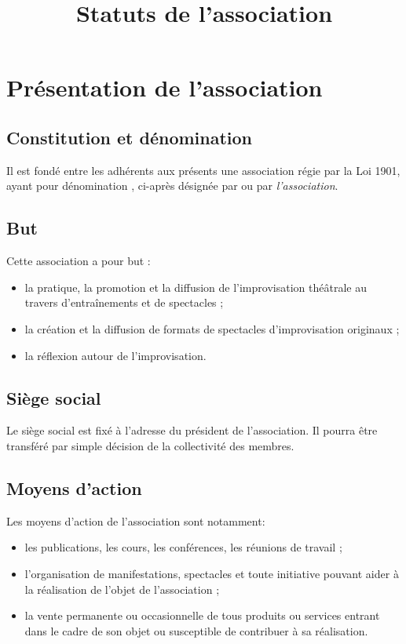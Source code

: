 \documentclass[a4paper,french,10pt]{article}
\title{Statuts de l'association \metae{}}
\newcommand{\article}[1]{\subsection{#1}\addtocounter{article}{1}}
\newcounter{article}
\begin{document}
\date{}

\maketitle 
\pagestyle{fancy} 


\rhead{\thepage} 
\cfoot{} 


\setcounter{article}{1}
\section{Présentation de l’association}
\article{Constitution et dénomination}
\label{sec:constitution}
Il est fondé entre les adhérents aux présents \statuts{} une association
régie par la Loi 1901, ayant pour dénomination \textit{\metae{}}, ci-après désignée par \textit{\meta{}} ou par \textit{l'association}.

\article{But}
\label{sec:but}

Cette association a pour but :
\begin{itemize}
\item la pratique, la promotion et la diffusion de l'improvisation théâtrale au travers d'entraînements et de spectacles ;
\item la création et la diffusion de formats de spectacles d'improvisation originaux ;
\item la réflexion autour de l'improvisation.
\end{itemize}

\article{Siège social}
\label{sec:siege}

Le siège social est fixé à l'adresse du président de l'association. Il
pourra être transféré par simple décision de la collectivité des
membres.

\article{Moyens d’action}
\label{sec:moyens}

Les moyens d’action de l’association sont notamment:
\begin{itemize}
\item les publications, les cours, les conférences, les réunions de
travail ;
\item l’organisation de manifestations, spectacles et toute initiative
pouvant aider à la réalisation de l’objet de l’association ;
\item la vente permanente ou occasionnelle de tous produits ou
services entrant dans le cadre de son objet ou susceptible de
contribuer à sa réalisation.
\end{itemize}
\end{document}
